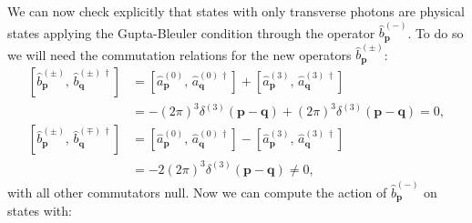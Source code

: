 We can now check explicitly that states with only transverse photons are physical states applying the Gupta-Bleuler condition through the operator \(\hat{b}^{(-)}_{\mathbf{p}}\). To do so we will need the commutation relations for the new operators \(\hat{b}^{(\pm)}_{\mathbf{p}}\):
\[
    \begin{aligned}
        \left[\hat{b}^{(\pm)}_{\mathbf{p}},\, \hat{b}^{(\pm)\,\dagger}_{\mathbf{q}}\right] & = \left[ \hat{a}^{(0)}_{\mathbf{p}},\, \hat{a}^{(0)\,\dagger}_{\mathbf{q}} \right] + \left[ \hat{a}^{(3)}_{\mathbf{p}},\, \hat{a}^{(3)\,\dagger}_{\mathbf{q}} \right] \\
                                                                                           & = - (2\pi)^3 \delta^{(3)}(\mathbf{p} - \mathbf{q}) + (2\pi)^3 \delta^{(3)}(\mathbf{p} - \mathbf{q}) = 0,                                                              \\
        \left[\hat{b}^{(\pm)}_{\mathbf{p}},\, \hat{b}^{(\mp)\,\dagger}_{\mathbf{q}}\right] & = \left[ \hat{a}^{(0)}_{\mathbf{p}},\, \hat{a}^{(0)\,\dagger}_{\mathbf{q}} \right] - \left[ \hat{a}^{(3)}_{\mathbf{p}},\, \hat{a}^{(3)\,\dagger}_{\mathbf{q}} \right] \\
                                                                                           & = - 2 (2\pi)^3 \delta^{(3)}(\mathbf{p} - \mathbf{q}) \neq 0,
    \end{aligned}
\]
with all other commutators null. Now we can compute the action of \(\hat{b}^{(-)}_{\mathbf{p}}\) on states with:
